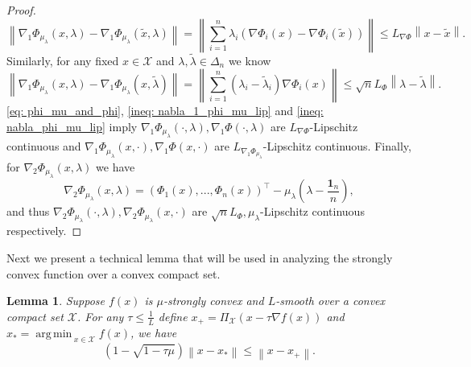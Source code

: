 \documentclass[10pt]{article}
\newtheorem{lemma}{Lemma}[section]
\theoremstyle{remark}
\newcommand{\cX}{\mathcal{X}}
\newcommand{\norm}[1]{\left\|#1\right\|}
\newcommand{\T}{^\top}
\newcommand{\bfone}{\mathbf{1}}
\DeclareMathOperator*{\argmin}{arg\,min\,}
\begin{document}
\begin{proof}
\begin{equation}
        \norm{\nabla_1\Phi_{\mu_{\lambda}}(x,\lambda) - \nabla_1\Phi_{\mu_{\lambda}}(\tilde x, \lambda)} = \norm{\sum_{i=1}^{n}\lambda_i\left(\nabla\Phi_i(x) - \nabla\Phi_i(\tilde x)\right)}\leq L_{\nabla \Phi}\norm{x - \tilde x}.
    \end{equation}
    Similarly, for any fixed $x\in \cX$ and $\lambda, \tilde \lambda \in \Delta_n$ we know
    \begin{equation}\label{ineq: nabla_phi_mu_lip}
        \norm{\nabla_1\Phi_{\mu_{\lambda}}(x,\lambda) - \nabla_1\Phi_{\mu_{\lambda}}(x,\tilde \lambda)} = \norm{\sum_{i=1}^{n}\left(\lambda_i-\tilde \lambda_i\right)\nabla\Phi_i(x)}\leq \sqrt{n}L_{\Phi}\norm{\lambda - \tilde \lambda}.
    \end{equation}
    \eqref{eq: phi_mu_and_phi}, \eqref{ineq: nabla_1_phi_mu_lip} and \eqref{ineq: nabla_phi_mu_lip} imply $\nabla_1\Phi_{\mu_{\lambda}}(\cdot, \lambda), \nabla_1\Phi(\cdot, \lambda)$ are $L_{\nabla \Phi}$-Lipschitz continuous and $\nabla_1\Phi_{\mu_{\lambda}}(x,\cdot), \nabla_1\Phi(x,\cdot)$ are $L_{\nabla_1\Phi_{\mu_{\lambda}}}$-Lipschitz continuous. Finally, for $\nabla_2\Phi_{\mu_{\lambda}}(x,\lambda)$ we have
    \[
        \nabla_2\Phi_{\mu_{\lambda}}(x,\lambda) = \left(\Phi_1(x), ..., \Phi_n(x)\right)\T - \mu_{\lambda}\left(\lambda - \frac{\bfone_n}{n}\right),
    \]
    and thus $\nabla_2\Phi_{\mu_{\lambda}}(\cdot,\lambda), \nabla_2\Phi_{\mu_{\lambda}}(x,\cdot)$ are $\sqrt{n}L_{\Phi}, \mu_{\lambda}$-Lipschitz continuous respectively.
\end{proof}

Next we present a technical lemma that will be used in analyzing the strongly convex function over a convex compact set.
\begin{lemma}\label{lem: coercivity}
    Suppose $f(x)$ is $\mu$-strongly convex and $L$-smooth over a convex compact set $\cX$. For any $\tau \leq \frac{1}{L}$ define $x_+ = \Pi_{\cX}(x - \tau\nabla f(x))$ and $x_* = \argmin_{x\in\cX} f(x)$, we have
    \[
        \left(1 - \sqrt{1 - \tau\mu}\right)\norm{x - x_*}\leq \norm{x-x_+}.
    \]
\end{lemma}
\end{document}
